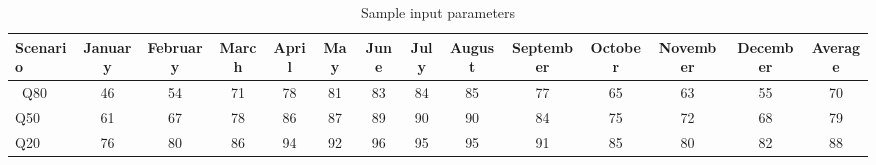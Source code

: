 \begin{table}
\label{tab:Sampleworkability}
\begin{tabular}{lccccccccccccc}
\hline 
Scenario & January & February & March & April  & May & June & July & August & September & October & November & December & Average \\
\hline \
Q80 & 46 & 54 & 71 & 78  & 81 & 83 & 84 & 85 & 77 & 65 & 63 & 55 & 70\\
Q50 & 61 & 67 & 78 & 86  & 87 & 89 & 90 & 90 & 84 & 75 & 72 & 68 & 79\\
Q20 & 76 & 80 & 86 & 94  & 92 & 96 & 95 & 95 & 91 & 85 & 80 & 82 & 88  \\
\hline 
\end{tabular}
\caption{Sample input parameters }
\end{table}